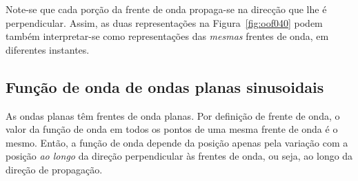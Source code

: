 Note-se que cada porção da frente de onda propaga-se na direcção que lhe é
perpendicular. Assim, as duas representações na Figura~\ref{fig:oof040} podem
também interpretar-se como representações das \emph{mesmas} frentes de onda, em
diferentes instantes.

\subsection{Função de onda de ondas planas sinusoidais}
As ondas planas têm frentes de onda planas. Por definição de frente de onda, o
valor da função de onda em todos os pontos de uma mesma frente de onda é
o mesmo. Então, a função de onda depende da posição apenas pela variação com a
posição \emph{ao longo} da direção perpendicular às frentes de onda, ou seja, ao
longo da direção de propagação.

